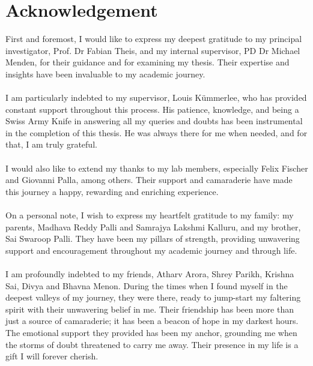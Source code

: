 \documentclass[12pt,a4paper]{article}
\newcommand{\mysupervisor}{Prof. Dr Fabian Theis}
\newcommand{\myinternalsupervisor}{PD Dr Michael Menden}
\begin{document}

\RaggedRight


\newpage

\newpage

\section{Acknowledgement}
\label{Acknowledgement}

First and foremost, I would like to express my deepest gratitude to my principal investigator, \mysupervisor{}, and my internal supervisor, \myinternalsupervisor{}, for their guidance and for examining my thesis. Their expertise and insights have been invaluable to my academic journey.
\paragraph{}
I am particularly indebted to my supervisor, Louis Kümmerlee, who has provided constant support throughout this process. His patience, knowledge, and being a Swiss Army Knife in answering all my queries and doubts has been instrumental in the completion of this thesis. He was always there for me when needed, and for that, I am truly grateful.
\paragraph{}
I would also like to extend my thanks to my lab members, especially Felix Fischer and Giovanni Palla, among others. Their support and camaraderie have made this journey a happy, rewarding and enriching experience.
\paragraph{}
On a personal note, I wish to express my heartfelt gratitude to my family: my parents, Madhava Reddy Palli and Samrajya Lakshmi Kalluru, and my brother, Sai Swaroop Palli. They have been my pillars of strength, providing unwavering support and encouragement throughout my academic journey and through life.
\paragraph{}
I am profoundly indebted to my friends, Atharv Arora, Shrey Parikh, Krishna Sai, Divya and Bhavna Menon. During the times when I found myself in the deepest valleys of my journey, they were there, ready to jump-start my faltering spirit with their unwavering belief in me. Their friendship has been more than just a source of camaraderie; it has been a beacon of hope in my darkest hours. The emotional support they provided has been my anchor, grounding me when the storms of doubt threatened to carry me away. Their presence in my life is a gift I will forever cherish.
\end{document}
